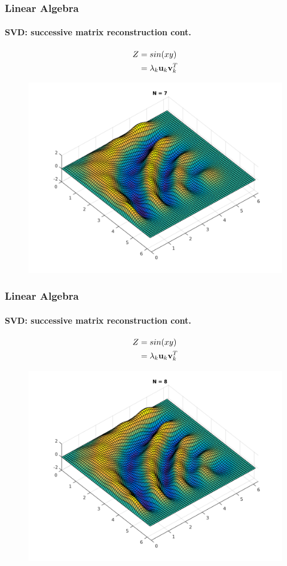 \documentclass[hyperref={pdfpagelabels=true}]{beamer}
\begin{document}
\begin{frame}
\frametitle{Linear Algebra}
\framesubtitle{SVD: successive matrix reconstruction {\tiny cont.}} 
\small{
\begin{center}
\begin{align*}
Z &= sin(xy) \\
  &= \lambda_k{\bf u}_k {\bf v}_k^T
\end{align*}
\end{center}}
\begin{figure}[!htb]
\centering
\includegraphics [scale=0.415]{as/a7.png}
\end{figure}
\end{frame}

\begin{frame}
\frametitle{Linear Algebra}
\framesubtitle{SVD: successive matrix reconstruction {\tiny cont.}} 
\small{
\begin{center}
\begin{align*}
Z &= sin(xy) \\
  &= \lambda_k{\bf u}_k {\bf v}_k^T
\end{align*}
\end{center}}
\begin{figure}[!htb]
\centering
\includegraphics [scale=0.415]{as/a8.png}
\end{figure}
\end{frame}
\end{document}
